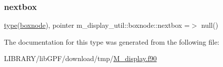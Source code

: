 \subsubsection{\texorpdfstring{nextbox}{nextbox}}
{\footnotesize\ttfamily \hyperlink{stop__watch_83_8txt_a70f0ead91c32e25323c03265aa302c1c}{type}(\hyperlink{structm__display__util_1_1boxnode}{boxnode}), pointer m\+\_\+display\+\_\+util\+::boxnode\+::nextbox =$>$ null()\hspace{0.3cm}{\ttfamily [private]}}



The documentation for this type was generated from the following file\+:\begin{DoxyCompactItemize}
\item 
L\+I\+B\+R\+A\+R\+Y/lib\+G\+P\+F/download/tmp/\hyperlink{M__display_8f90}{M\+\_\+display.\+f90}\end{DoxyCompactItemize}
